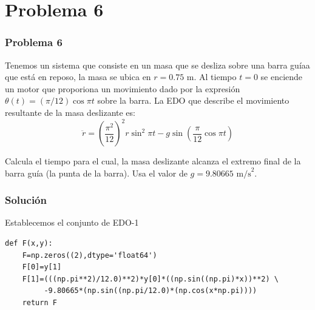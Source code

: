 \section{Problema 6}
\begin{frame}
\frametitle{Problema 6}
Tenemos un sistema que consiste en un masa que se desliza sobre una barra guíaa que está en reposo, la masa se ubica en $r=0.75$ m. Al tiempo $t=0$ se enciende un motor que proporiona un movimiento dado por la expresión $\theta(t) = (\pi/12) \cos \pi t$ sobre la barra. La EDO que describe el movimiento resultante de la masa deslizante es:
\[ \ddot{r} = \left( \dfrac{\pi^{2}}{12}\right)^{2}  r \sin^{2} \pi t - g \sin \left( \dfrac{\pi}{12} \cos \pi t \right) \]
\end{frame}
\begin{frame}[fragile]
\begin{center}
\end{center}
Calcula el tiempo para el cual, la masa deslizante alcanza el extremo final de la barra guía (la punta de la barra). Usa el valor de $g=9.80665 \mbox{ m/s}^{2}$.
\end{frame}
\begin{frame}[fragile]
\frametitle{Solución}
Establecemos el conjunto de EDO-1
\begin{lstlisting}
def F(x,y):
    F=np.zeros((2),dtype='float64')
    F[0]=y[1]
    F[1]=(((np.pi**2)/12.0)**2)*y[0]*((np.sin((np.pi)*x))**2) \
         -9.80665*(np.sin((np.pi/12.0)*(np.cos(x*np.pi))))
    return F
\end{lstlisting}
\end{frame}
